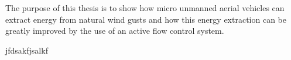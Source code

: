 \par The purpose of this thesis is to show how micro unmanned aerial vehicles can extract energy
from natural wind gusts and how this energy extraction can be greatly improved by the use of
an active flow control system.


\par jfdsakfjsalkf


